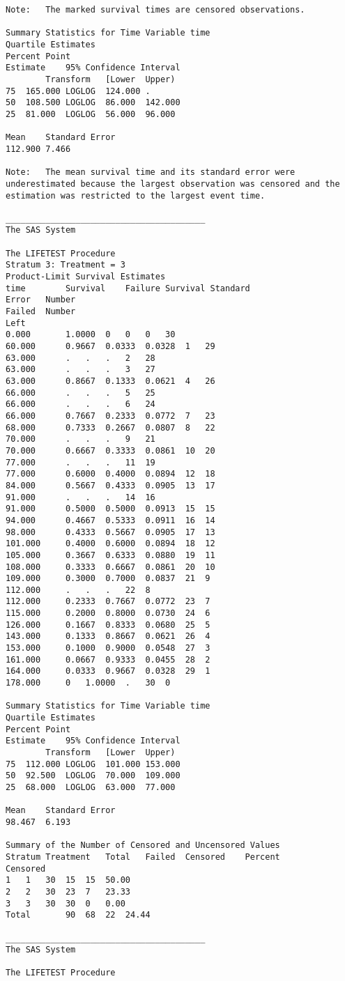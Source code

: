 \documentclass[11pt]{article}
\numberwithin{figure}{section}
\begin{document}
\begin{verbatim}
Note:	The marked survival times are censored observations.

Summary Statistics for Time Variable time
Quartile Estimates
Percent	Point
Estimate	95% Confidence Interval
		Transform	[Lower	Upper)
75	165.000	LOGLOG	124.000	.
50	108.500	LOGLOG	86.000	142.000
25	81.000	LOGLOG	56.000	96.000

Mean	Standard Error
112.900	7.466

Note:	The mean survival time and its standard error were underestimated because the largest observation was censored and the estimation was restricted to the largest event time.

________________________________________
The SAS System

The LIFETEST Procedure
Stratum 3: Treatment = 3
Product-Limit Survival Estimates
time		Survival	Failure	Survival Standard
Error	Number
Failed	Number
Left
0.000		1.0000	0	0	0	30
60.000		0.9667	0.0333	0.0328	1	29
63.000		.	.	.	2	28
63.000		.	.	.	3	27
63.000		0.8667	0.1333	0.0621	4	26
66.000		.	.	.	5	25
66.000		.	.	.	6	24
66.000		0.7667	0.2333	0.0772	7	23
68.000		0.7333	0.2667	0.0807	8	22
70.000		.	.	.	9	21
70.000		0.6667	0.3333	0.0861	10	20
77.000		.	.	.	11	19
77.000		0.6000	0.4000	0.0894	12	18
84.000		0.5667	0.4333	0.0905	13	17
91.000		.	.	.	14	16
91.000		0.5000	0.5000	0.0913	15	15
94.000		0.4667	0.5333	0.0911	16	14
98.000		0.4333	0.5667	0.0905	17	13
101.000		0.4000	0.6000	0.0894	18	12
105.000		0.3667	0.6333	0.0880	19	11
108.000		0.3333	0.6667	0.0861	20	10
109.000		0.3000	0.7000	0.0837	21	9
112.000		.	.	.	22	8
112.000		0.2333	0.7667	0.0772	23	7
115.000		0.2000	0.8000	0.0730	24	6
126.000		0.1667	0.8333	0.0680	25	5
143.000		0.1333	0.8667	0.0621	26	4
153.000		0.1000	0.9000	0.0548	27	3
161.000		0.0667	0.9333	0.0455	28	2
164.000		0.0333	0.9667	0.0328	29	1
178.000		0	1.0000	.	30	0

Summary Statistics for Time Variable time
Quartile Estimates
Percent	Point
Estimate	95% Confidence Interval
		Transform	[Lower	Upper)
75	112.000	LOGLOG	101.000	153.000
50	92.500	LOGLOG	70.000	109.000
25	68.000	LOGLOG	63.000	77.000

Mean	Standard Error
98.467	6.193

Summary of the Number of Censored and Uncensored Values
Stratum	Treatment	Total	Failed	Censored	Percent
Censored
1	1	30	15	15	50.00
2	2	30	23	7	23.33
3	3	30	30	0	0.00
Total		90	68	22	24.44

________________________________________
The SAS System

The LIFETEST Procedure


\end{verbatim}
\end{document}
